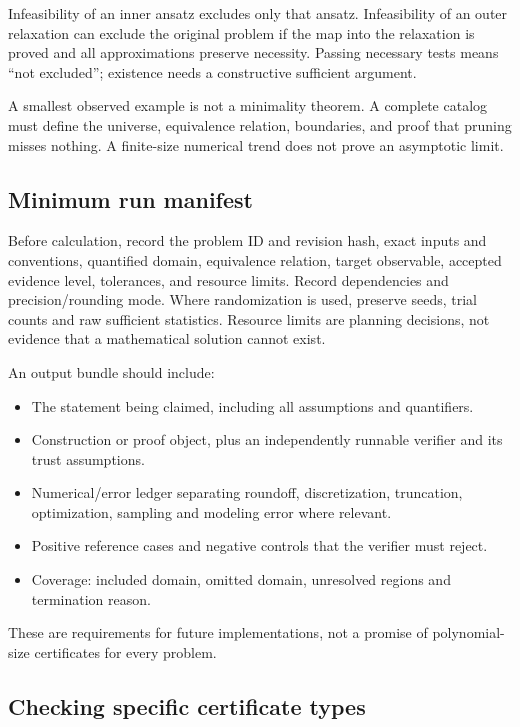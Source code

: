 \documentclass[
  11pt,
]{article}
\providecommand{\tightlist}{%
  \setlength{\itemsep}{0pt}\setlength{\parskip}{0pt}}
\begin{document}
Infeasibility of an inner ansatz excludes only that ansatz.
Infeasibility of an outer relaxation can exclude the original problem if
the map into the relaxation is proved and all approximations preserve
necessity. Passing necessary tests means ``not excluded''; existence
needs a constructive sufficient argument.

A smallest observed example is not a minimality theorem. A complete
catalog must define the universe, equivalence relation, boundaries, and
proof that pruning misses nothing. A finite-size numerical trend does
not prove an asymptotic limit.

\subsection{Minimum run manifest}

Before calculation, record the problem ID and revision hash, exact
inputs and conventions, quantified domain, equivalence relation, target
observable, accepted evidence level, tolerances, and resource limits.
Record dependencies and precision/rounding mode. Where randomization is
used, preserve seeds, trial counts and raw sufficient statistics.
Resource limits are planning decisions, not evidence that a mathematical
solution cannot exist.

An output bundle should include:

\begin{itemize}
\tightlist
\item
  The statement being claimed, including all assumptions and
  quantifiers.
\item
  Construction or proof object, plus an independently runnable verifier
  and its trust assumptions.
\item
  Numerical/error ledger separating roundoff, discretization,
  truncation, optimization, sampling and modeling error where relevant.
\item
  Positive reference cases and negative controls that the verifier must
  reject.
\item
  Coverage: included domain, omitted domain, unresolved regions and
  termination reason.
\end{itemize}

These are requirements for future implementations, not a promise of
polynomial-size certificates for every problem.

\subsection{Checking specific certificate types}
\end{document}
